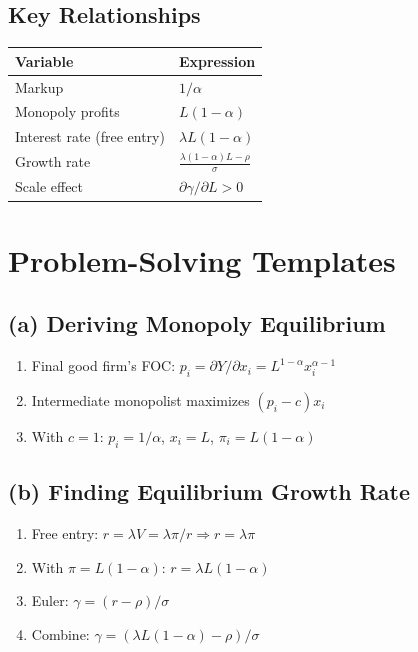 \documentclass[a4paper,11pt]{article}
\begin{document}
\subsection*{Key Relationships}
\begin{center}
\begin{tabular}{ll}
\toprule
\textbf{Variable} & \textbf{Expression} \\
\midrule
Markup & $1/\alpha$ \\
Monopoly profits & $L(1-\alpha)$ \\
Interest rate (free entry) & $\lambda L (1-\alpha)$ \\
Growth rate & $\frac{\lambda(1-\alpha)L - \rho}{\sigma}$ \\
Scale effect & $\partial\gamma/\partial L > 0$ \\
\bottomrule
\end{tabular}
\end{center}

\clearpage

\section{Problem-Solving Templates}

\subsection*{(a) Deriving Monopoly Equilibrium}
\begin{enumerate}
    \item Final good firm's FOC: $p_i = \partial Y/\partial x_i = L^{1-\alpha} x_i^{\alpha-1}$
    \item Intermediate monopolist maximizes $(p_i - c)x_i$
    \item With $c = 1$: $p_i = 1/\alpha$, $x_i = L$, $\pi_i = L(1-\alpha)$
\end{enumerate}

\subsection*{(b) Finding Equilibrium Growth Rate}
\begin{enumerate}
    \item Free entry: $r = \lambda V = \lambda \pi/r \Rightarrow r = \lambda \pi$
    \item With $\pi = L(1-\alpha)$: $r = \lambda L (1-\alpha)$
    \item Euler: $\gamma = (r - \rho)/\sigma$
    \item Combine: $\gamma = (\lambda L (1-\alpha) - \rho)/\sigma$
\end{enumerate}
\end{document}
